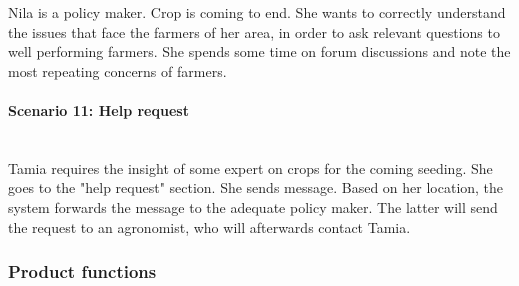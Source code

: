 Nila is a policy maker. Crop is coming to end. She wants to correctly understand the issues that face the farmers of her area, in order to ask relevant questions to well performing farmers. She spends some time on forum discussions and note the most repeating concerns of farmers.

\paragraph{Scenario 11: Help request}\mbox{} \\

Tamia requires the insight of some expert on crops for the coming seeding. She goes to the "help request" section. She sends message. Based on her location, the system forwards the message to the adequate policy maker. The latter will send the request to an agronomist, who will afterwards contact Tamia.

\subsubsection{Product functions}

